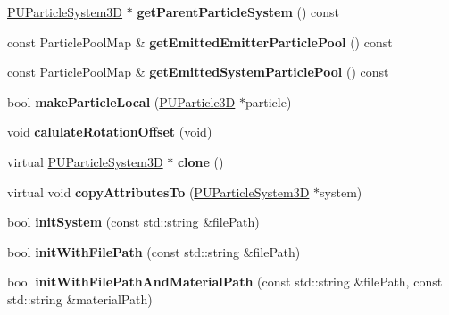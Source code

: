 \begin{DoxyCompactItemize}
\hyperlink{classPUParticleSystem3D}{P\+U\+Particle\+System3D} $\ast$ {\bfseries get\+Parent\+Particle\+System} () const
\item 
\mbox{\label{classPUParticleSystem3D_aa5caea161afed8e637b3441cc62f5d5b}} 
const Particle\+Pool\+Map \& {\bfseries get\+Emitted\+Emitter\+Particle\+Pool} () const
\item 
\mbox{\label{classPUParticleSystem3D_a448a09e71f98bbfce4d9b31d309fade7}} 
const Particle\+Pool\+Map \& {\bfseries get\+Emitted\+System\+Particle\+Pool} () const
\item 
\mbox{\label{classPUParticleSystem3D_ac23bb10ddaae44d47269da25cc0c8411}} 
bool {\bfseries make\+Particle\+Local} (\hyperlink{structPUParticle3D}{P\+U\+Particle3D} $\ast$particle)
\item 
\mbox{\label{classPUParticleSystem3D_a399e6e4c5e54c5ec87cb1d38f7d254af}} 
void {\bfseries calulate\+Rotation\+Offset} (void)
\item 
\mbox{\label{classPUParticleSystem3D_a3268f662d308f01284c3581d56eddd73}} 
virtual \hyperlink{classPUParticleSystem3D}{P\+U\+Particle\+System3D} $\ast$ {\bfseries clone} ()
\item 
\mbox{\label{classPUParticleSystem3D_a053a47fb92e2448c71ea978adfebcdcd}} 
virtual void {\bfseries copy\+Attributes\+To} (\hyperlink{classPUParticleSystem3D}{P\+U\+Particle\+System3D} $\ast$system)
\item 
\mbox{\label{classPUParticleSystem3D_acdd48ac0ca39bf0a32f4eb8d3ee91813}} 
bool {\bfseries init\+System} (const std\+::string \&file\+Path)
\item 
\mbox{\label{classPUParticleSystem3D_a75bd51ae2fae4109e3211b82e5dfabb0}} 
bool {\bfseries init\+With\+File\+Path} (const std\+::string \&file\+Path)
\item 
\mbox{\label{classPUParticleSystem3D_a258ffd9a1253de6d18a52a0e6bf63191}} 
bool {\bfseries init\+With\+File\+Path\+And\+Material\+Path} (const std\+::string \&file\+Path, const std\+::string \&material\+Path)
\end{DoxyCompactItemize}
